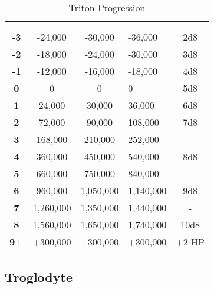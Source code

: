 \begin{multicols*}{2}
\begin {table}[H]
  \caption{Triton Progression}
  \begin{tabularx}{\columnwidth}{>{\bfseries}cccYc}
	\thead{} &  & \thead{}\\
	 &  &  &  & \\
	-3 & -24,000 & -30,000 & -36,000 & 2d8\\
	-2 & -18,000 & -24,000 & -30,000 & 3d8\\
	-1 & -12,000 & -16,000 & -18,000 & 4d8\\
	0 & 0 & 0 & 0 & 5d8\\
	1 & 24,000 & 30,000 & 36,000 & 6d8\\
	2 & 72,000 & 90,000 & 108,000 & 7d8\\
	3 & 168,000 & 210,000 & 252,000 & -\\
	4 & 360,000 & 450,000 & 540,000 & 8d8\\
	5 & 660,000 & 750,000 & 840,000 & -\\
	6 & 960,000 & 1,050,000 & 1,140,000 & 9d8\\
	7 & 1,260,000 & 1,350,000 & 1,440,000 & -\\
	8 & 1,560,000 & 1,650,000 & 1,740,000 & 10d8\\
	9+ & +300,000 & +300,000 & +300,000 & +2 HP
  \end {tabularx}
\end {table}

\subsection{Troglodyte}
\end{multicols*}
